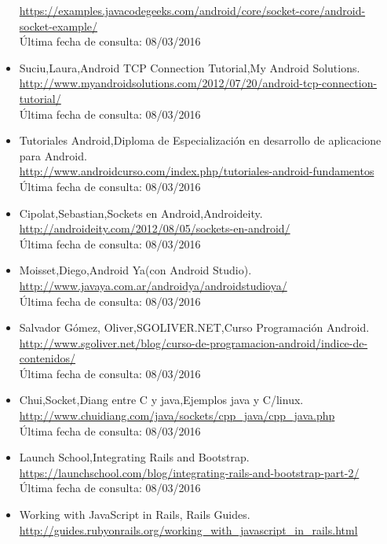 \begin{itemize}
 \href{url}{https://examples.javacodegeeks.com/android/core/socket-core/android-socket-example/}\\
	Última fecha de consulta:  	08/03/2016
\item Suciu,Laura,Android TCP Connection Tutorial,My Android Solutions.\\
	 \href{url}{http://www.myandroidsolutions.com/2012/07/20/android-tcp-connection-tutorial/}\\
	Última fecha de consulta: 	08/03/2016
\item Tutoriales Android,Diploma de Especialización en desarrollo de aplicacione para Android.\\
	 \href{url}{http://www.androidcurso.com/index.php/tutoriales-android-fundamentos}\\
	Última fecha de consulta: 	 08/03/2016
\item Cipolat,Sebastian,Sockets en Android,Androideity.\\
	 \href{url}{http://androideity.com/2012/08/05/sockets-en-android/}\\
	Última fecha de consulta: 	 08/03/2016
\item Moisset,Diego,Android Ya(con Android Studio).\\
	 \href{url}{http://www.javaya.com.ar/androidya/androidstudioya/}\\
	Última fecha de consulta: 	 08/03/2016
\item Salvador Gómez, Oliver,SGOLIVER.NET,Curso Programación Android.\\
	 \href{url}{http://www.sgoliver.net/blog/curso-de-programacion-android/indice-de-contenidos/}\\
	Última fecha de consulta: 	 08/03/2016
\item Chui,Socket,Diang entre C y java,Ejemplos java y C/linux.\\
	 \href{url}{http://www.chuidiang.com/java/sockets/cpp\_java/cpp\_java.php}\\
	Última fecha de consulta: 	 08/03/2016
\item Launch School,Integrating Rails and Bootstrap.\\
	 \href{url}{https://launchschool.com/blog/integrating-rails-and-bootstrap-part-2/}\\
	Última fecha de consulta: 	 08/03/2016
\item Working with JavaScript in Rails, Rails Guides.\\
	 \href{url}{http://guides.rubyonrails.org/working\_with\_javascript\_in\_rails.html}\\

\end{itemize}
